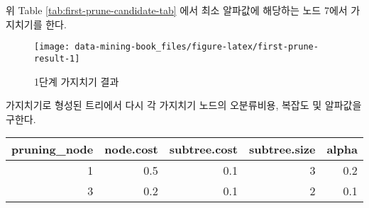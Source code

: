 \documentclass[]{book}
\newenvironment{Shaded}{\begin{snugshade}}{\end{snugshade}}
\newcommand{\DataTypeTok}[1]{\textcolor[rgb]{0.13,0.29,0.53}{#1}}
\newcommand{\FloatTok}[1]{\textcolor[rgb]{0.00,0.00,0.81}{#1}}
\newcommand{\KeywordTok}[1]{\textcolor[rgb]{0.13,0.29,0.53}{\textbf{#1}}}
\newcommand{\NormalTok}[1]{#1}
\newcommand{\OperatorTok}[1]{\textcolor[rgb]{0.81,0.36,0.00}{\textbf{#1}}}
\newcommand{\StringTok}[1]{\textcolor[rgb]{0.31,0.60,0.02}{#1}}
\begin{document}
위 Table \ref{tab:first-prune-candidate-tab} 에서 최소 알파값에 해당하는 노드 7에서 가지치기를 한다.

\begin{Shaded}
\end{Shaded}

\begin{figure}

{\centering \texttt{[image: data-mining-book\_files/figure-latex/first-prune-result-1]} 

}

\caption{1단계 가지치기 결과}\label{fig:first-prune-result}
\end{figure}

가지치기로 형성된 트리에서 다시 각 가지치기 노드의 오분류비용, 복잡도 및 알파값을 구한다.

\begin{Shaded}
\end{Shaded}

\begin{tabular}{r|r|r|r|r}
\hline
pruning\_node & node.cost & subtree.cost & subtree.size & alpha\\
\hline
1 & 0.5 & 0.1 & 3 & 0.2\\
\hline
3 & 0.2 & 0.1 & 2 & 0.1\\
\hline
\end{tabular}
\end{document}
